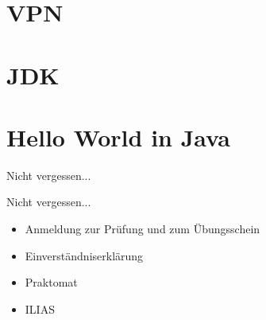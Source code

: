 \documentclass[18pt]{beamer}
\begin{document}
\section{VPN}
\section{JDK}
\section{Hello World in Java}

\appendix
\beginbackup

\begin{frame}{Nicht vergessen...}
    \begin{alertblock}{Nicht vergessen...}
        \begin{itemize}
        \item Anmeldung zur Prüfung und zum Übungsschein
        \item Einverständniserklärung
        \item Praktomat
        \item ILIAS
        \end{itemize}
    \end{alertblock}
\end{frame}

\backupend
\end{document}
